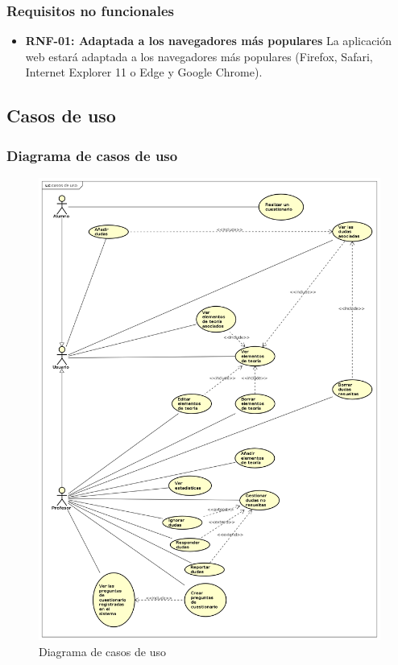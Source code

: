 \documentclass[openright,twoside,10pt]{book}
\providecommand{\tightlist}{%
  \setlength{\itemsep}{0pt}\setlength{\parskip}{0pt}}
\begin{document}
    \subsubsection{Requisitos no
    funcionales}\label{requisitos-no-funcionales}
    
    \begin{itemize}
    \tightlist
    \item
      \textbf{RNF-01: Adaptada a los navegadores más populares} La
      aplicación web estará adaptada a los navegadores más populares
      (Firefox, Safari, Internet Explorer 11 o Edge y Google Chrome).
    \end{itemize}
    
    \newpage
    
    \subsection{Casos de uso}\label{casos-de-uso}
    
    \subsubsection{Diagrama de casos de uso}\label{diagrama-de-casos-de-uso}
    
    \begin{figure}[H]
        \begin{center}
            \includegraphics[scale=0.40]{img/astah/analisis/casos_de_uso/useCase00.png}
        \end{center}
        \caption{Diagrama de casos de uso}
    \end{figure}
    
\end{document}
